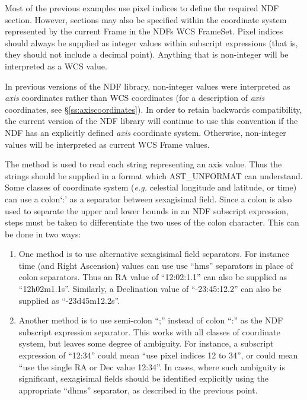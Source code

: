 \documentclass[twoside,11pt,nolof]{starlink}
\providecommand{\st}[1]{{\emph{#1}}}
\begin{document}
Most of the previous examples use pixel indices to define the required
NDF section. However, sections may also be specified within the coordinate
system represented by the current Frame in the NDFs WCS FrameSet. Pixel
indices should always be supplied as integer values within subscript
expressions (that is, they should not include a decimal point). Anything
that is non-integer will be interpreted as a WCS value.

In previous versions of the NDF library, non-integer values were interpreted
as \st{axis\/} coordinates rather than WCS coordinates (for a description of
\st{axis\/} coordinates, see \S\ref{ss:axiscoordinates}). In order to
retain backwards compatibility, the current version of the NDF library
will continue to use this convention if the NDF has an explicitly
defined \st{axis\/} coordinate system. Otherwise, non-integer values will
be interpreted as  current WCS Frame values.

The  method is used to read each
string representing an axis value. Thus the strings should be supplied in
a format which AST\_UNFORMAT can understand. Some classes of coordinate
system (\st{e.g.\/} celestial longitude and latitude, or time) can use a
colon`:' as a separator between sexagisimal field. Since a colon is also
used to separate the upper and lower bounds in an NDF subscript expression,
steps must be taken to differentiate the two uses of the colon character.
This can be done in two ways:

\begin{enumerate}
\item One method is to use alternative sexagisimal field separators. For
instance time (and Right Ascension) values can use use ``hms''
separators in place of colon separators. Thus an RA value of ``12:02:1.1''
can also be supplied as ``12h02m1.1s''. Similarly, a Declination value of
``-23:45:12.2'' can also be supplied as ``-23d45m12.2s''.
\item Another method is to use semi-colon ``;'' instead of colon ``:'' as
the NDF subscript expression separator. This works with all classes of
coordinate system, but leaves some degree of ambiguity. For instance,
a subscript expression of ``12:34'' could mean ``use pixel indices 12 to
34'', or could mean ``use the single RA or Dec value 12:34''. In cases,
where such ambiguity is significant, sexagisimal fields should be
identified explicitly using the appropriate ``dhms'' separator, as
described in the previous point.
\end{enumerate}
\end{document}
